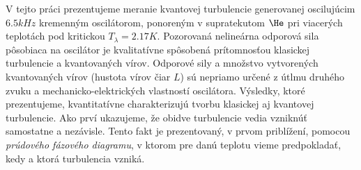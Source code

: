 V tejto práci prezentujeme meranie kvantovej turbulencie generovanej oscilujúcim $ 6.5\unit{kHz} $ kremenným oscilátorom, ponoreným v supratekutom $ \He $ pri viacerých teplotách pod kritickou $ T_{\lambda} = 2.17\unit{K} $. Pozorovaná nelineárna odporová sila pôsobiaca na oscilátor je kvalitatívne spôsobená prítomnosťou klasickej turbulencie a kvantovaných vírov. Odporové sily a množstvo vytvorených kvantovaných vírov (hustota vírov čiar $ L $) sú nepriamo určené z útlmu druhého zvuku a mechanicko-elektrických vlastností oscilátora.
Výsledky, ktoré prezentujeme, kvantitatívne charakterizujú tvorbu klasickej aj kvantovej turbulencie. Ako prví ukazujeme, že obidve turbulencie vedia vzniknúť samostatne a nezávisle. Tento fakt je prezentovaný, v prvom priblížení, pomocou \textit{prúdového fázového diagramu}, v ktorom pre danú teplotu vieme predpokladať, kedy a ktorá turbulencia vzniká.